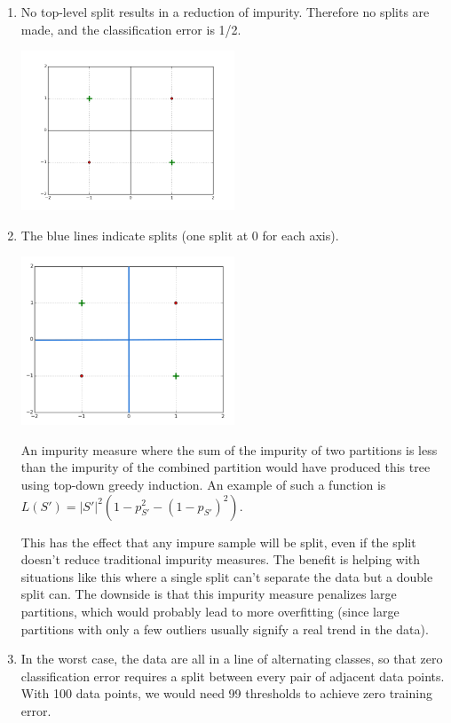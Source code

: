 \begin{solution}

    \begin{enumerate}[\bf{i}]
        \item 
            No top-level split results in a reduction of impurity.
            Therefore no splits are made, and the classification error is 1/2.

            \includegraphics[width=0.5\textwidth]{plots/3C.png}

        \item
            The blue lines indicate splits (one split at 0 for each axis).

            \includegraphics[width=0.5\textwidth]{images/1c_ii.png}

            An impurity measure where the sum of the impurity of two partitions is less than the impurity of the combined partition would have produced this tree using top-down greedy induction.
            An example of such a function is $L(S') = |S'|^2 (1 - p_{S'}^2 - (1-p_{S'})^2)$.

            This has the effect that any impure sample will be split, even if the split doesn't reduce traditional impurity measures.
            The benefit is helping with situations like this where a single split can't separate the data but a double split can.
            The downside is that this impurity measure penalizes large partitions, which would probably lead to more overfitting (since large partitions with only a few outliers usually signify a real trend in the data).

        \item
            In the worst case, the data are all in a line of alternating classes, so that zero classification error requires a split between every pair of adjacent data points.
            With 100 data points, we would need 99 thresholds to achieve zero training error.
    \end{enumerate}
\end{solution}

